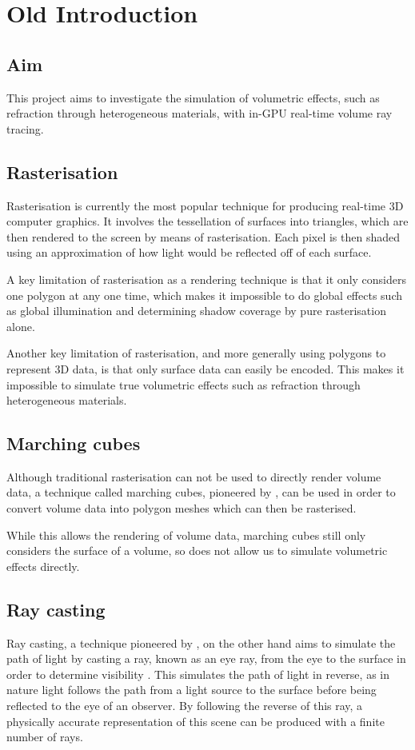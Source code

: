 \chapter{Old Introduction}
\label{intro}

\section{Aim}
This project aims to investigate the simulation of volumetric effects, such as refraction through heterogeneous materials, with in-GPU real-time volume ray tracing.

\section{Rasterisation}
Rasterisation is currently the most popular technique for producing real-time 3D computer graphics. It involves the tessellation of surfaces into triangles, which are then rendered to the screen by means of rasterisation. Each pixel is then shaded using an approximation of how light would be reflected off of each surface.

A key limitation of rasterisation as a rendering technique is that it only considers one polygon at any one time, which makes it impossible to do global effects such as global illumination and determining shadow coverage by pure rasterisation alone.

Another key limitation of rasterisation, and more generally using polygons to represent 3D data, is that only surface data can easily be encoded. This makes it impossible to simulate true volumetric effects such as refraction through heterogeneous materials.

\section{Marching cubes}
Although traditional rasterisation can not be used to directly render volume data, a technique called marching cubes, pioneered by \cite{lorensen87marchingcubes}, can be used in order to convert volume data into polygon meshes which can then be rasterised.

While this allows the rendering of volume data, marching cubes still only considers the surface of a volume, so does not allow us to simulate volumetric effects directly.

\section{Ray casting}
Ray casting, a technique pioneered by \cite{appel68raytracing}, on the other hand aims to simulate the path of light by casting a ray, known as an eye ray, from the eye to the surface in order to determine visibility \parencite{appel68raytracing}. This simulates the path of light in reverse, as in nature light follows the path from a light source to the surface before being reflected to the eye of an observer. By following the reverse of this ray, a physically accurate representation of this scene can be produced with a finite number of rays.

